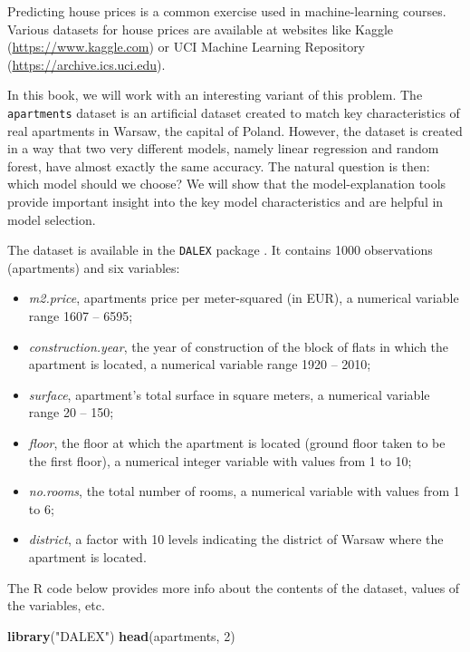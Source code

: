 \documentclass[12pt,]{krantz}
\newenvironment{Shaded}{\begin{snugshade}}{\end{snugshade}}
\newcommand{\DecValTok}[1]{\textcolor[rgb]{0.00,0.00,0.81}{#1}}
\newcommand{\KeywordTok}[1]{\textcolor[rgb]{0.13,0.29,0.53}{\textbf{#1}}}
\newcommand{\NormalTok}[1]{#1}
\newcommand{\StringTok}[1]{\textcolor[rgb]{0.31,0.60,0.02}{#1}}
\providecommand{\tightlist}{%
  \setlength{\itemsep}{0pt}\setlength{\parskip}{0pt}}
\begin{document}
Predicting house prices is a common exercise used in machine-learning courses. Various datasets for house prices are available at websites like Kaggle (\url{https://www.kaggle.com}) or UCI Machine Learning Repository (\url{https://archive.ics.uci.edu}).

In this book, we will work with an interesting variant of this problem. The \texttt{apartments} dataset is an artificial dataset created to match key characteristics of real apartments in Warsaw, the capital of Poland. However, the dataset is created in a way that two very different models, namely linear regression and random forest, have almost exactly the same accuracy. The natural question is then: which model should we choose? We will show that the model-explanation tools provide important insight into the key model characteristics and are helpful in model selection.

The dataset is available in the \texttt{DALEX} package \citep{DALEX}. It contains 1000 observations (apartments) and six variables:

\begin{itemize}
\tightlist
\item
  \emph{m2.price}, apartments price per meter-squared (in EUR), a numerical variable range 1607 -- 6595;
\item
  \emph{construction.year}, the year of construction of the block of flats in which the apartment is located, a numerical variable range 1920 -- 2010;
\item
  \emph{surface}, apartment's total surface in square meters, a numerical variable range 20 -- 150;
\item
  \emph{floor}, the floor at which the apartment is located (ground floor taken to be the first floor), a numerical integer variable with values from 1 to 10;
\item
  \emph{no.rooms}, the total number of rooms, a numerical variable with values from 1 to 6;
\item
  \emph{district}, a factor with 10 levels indicating the district of Warsaw where the apartment is located.
\end{itemize}

The R code below provides more info about the contents of the dataset, values of the variables, etc.

\begin{Shaded}
\begin{Highlighting}[]
\KeywordTok{library}\NormalTok{(}\StringTok{"DALEX"}\NormalTok{)}
\KeywordTok{head}\NormalTok{(apartments, }\DecValTok{2}\NormalTok{)}
\end{Highlighting}
\end{Shaded}
\end{document}

